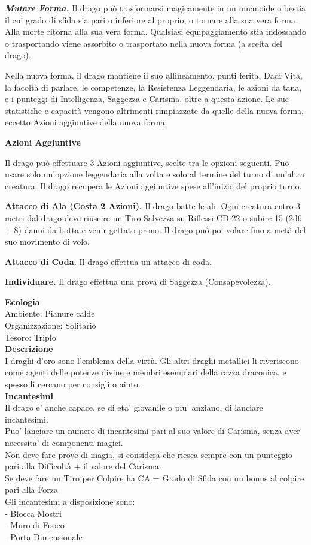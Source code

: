 \begin{multicols}{2}
\emph{\textbf{Mutare Forma.}} Il drago può trasformarsi magicamente in un umanoide o bestia il cui grado di sfida sia pari o inferiore al proprio, o tornare alla sua vera forma. Alla morte ritorna alla sua vera forma. Qualsiasi equipaggiamento stia indossando o trasportando viene assorbito o trasportato nella nuova forma (a scelta del drago).

Nella nuova forma, il drago mantiene il suo allineamento, punti ferita, Dadi Vita, la facoltà di parlare, le competenze, la Resistenza Leggendaria, le azioni da tana, e i punteggi di Intelligenza, Saggezza e Carisma, oltre a questa azione. Le sue statistiche e capacità vengono altrimenti rimpiazzate da quelle della nuova forma, eccetto Azioni aggiuntive della nuova forma. 

\textbf{Azioni Aggiuntive}

Il drago può effettuare 3 Azioni aggiuntive, scelte tra le opzioni seguenti. Può usare solo un'opzione leggendaria alla volta e solo al termine del turno di un'altra creatura. Il drago recupera le Azioni aggiuntive spese all'inizio del proprio turno.

\textbf{Attacco di Ala (Costa 2 Azioni).} Il drago batte le ali. Ogni creatura entro 3 metri dal drago deve riuscire un Tiro Salvezza su Riflessi CD 22 o subire 15 (2d6 + 8) danni da botta e venir gettato prono. Il drago può poi volare fino a metà del suo movimento di volo.

\textbf{Attacco di Coda.} Il drago effettua un attacco di coda.

\textbf{Individuare.} Il drago effettua una prova di Saggezza (Consapevolezza).

\textbf{Ecologia}\\
Ambiente: Pianure calde\\
Organizzazione: Solitario\\
Tesoro: Triplo\\
\textbf{Descrizione}\\
I draghi d'oro sono l'emblema della virtù. Gli altri draghi metallici li riveriscono come agenti delle potenze divine e membri esemplari della razza draconica, e spesso li cercano per consigli o aiuto.\\
\textbf{Incantesimi}\\
Il drago e' anche capace, se di eta' giovanile o piu' anziano, di lanciare incantesimi.\\
Puo' lanciare un numero di incantesimi pari al suo valore di Carisma, senza aver necessita' di componenti magici.\\
Non deve fare prove di magia, si considera che riesca sempre con un punteggio pari alla Difficoltà + il valore del Carisma.\\
Se deve fare un Tiro per Colpire ha CA = Grado di Sfida con un bonus al colpire pari alla Forza\\
Gli incantesimi a disposizione sono:\\
- Blocca Mostri\\
- Muro di Fuoco\\
- Porta Dimensionale\\


\end{multicols}
